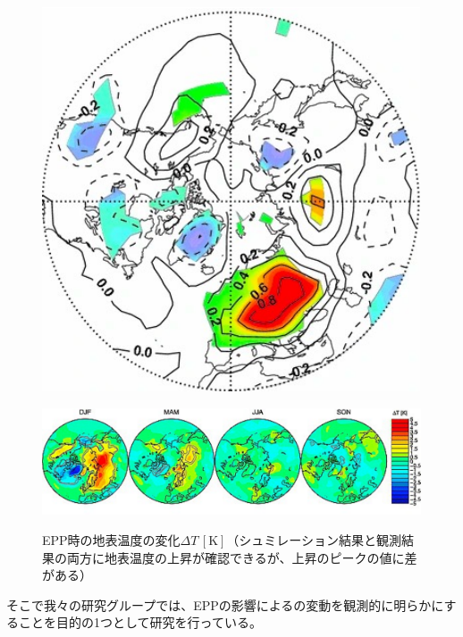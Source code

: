 \begin{figure}[htbp]
    \centering
    \begin{minipage}{\linewidth}
        \centering
        \includegraphics[scale=0.6]{master_thesis_contents/master_thesis_fig/rozanov2012_fig12.pdf}
        \label{fig:rozanov2012_fig12}
    \end{minipage}
    \begin{minipage}{\linewidth}
        \centering
        \includegraphics[scale=0.6]{master_thesis_contents/master_thesis_fig/seppala2009_fig3.pdf}
        \label{fig:seppala2009_fig3}
    \end{minipage}
    \caption{EPP時の地表温度の変化$\Delta T\, \mathrm{[K]}$（シュミレーション結果と観測結果の両方に地表温度の上昇が確認できるが、上昇のピークの値に差がある）}
    \label{fig:rozanov2012_seppala2009}
\end{figure}
そこで我々の研究グループでは、EPPの影響によるの変動を観測的に明らかにすることを目的の1つとして研究を行っている。
